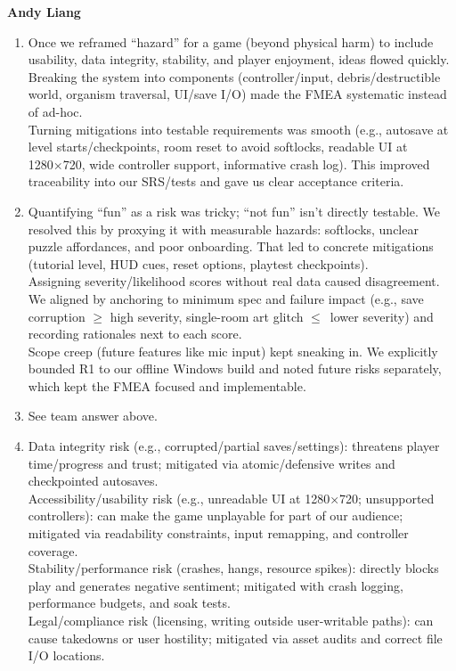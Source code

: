 \documentclass{article}
\begin{document}
\textbf{Andy Liang}
\begin{enumerate}
\item{Once we reframed “hazard” for a game (beyond physical harm) to include usability, data integrity, stability, and player enjoyment, ideas flowed quickly.\\

Breaking the system into components (controller/input, debris/destructible world, organism traversal, UI/save I/O) made the FMEA systematic instead of ad-hoc.\\

Turning mitigations into testable requirements was smooth (e.g., autosave at level starts/checkpoints, room reset to avoid softlocks, readable UI at 1280×720, wide controller support, informative crash log). This improved traceability into our SRS/tests and gave us clear acceptance criteria.}
\item{Quantifying “fun” as a risk was tricky; “not fun” isn’t directly testable. We resolved this by proxying it with measurable hazards: softlocks, unclear puzzle affordances, and poor onboarding. That led to concrete mitigations (tutorial level, HUD cues, reset options, playtest checkpoints).\\

Assigning severity/likelihood scores without real data caused disagreement. We aligned by anchoring to minimum spec and failure impact (e.g., save corruption $\geq$ high severity, single-room art glitch $\leq$\ lower severity) and recording rationales next to each score.\\

Scope creep (future features like mic input) kept sneaking in. We explicitly bounded R1 to our offline Windows build and noted future risks separately, which kept the FMEA focused and implementable.}
\item{See team answer above.}
\item{Data integrity risk (e.g., corrupted/partial saves/settings): threatens player time/progress and trust; mitigated via atomic/defensive writes and checkpointed autosaves.\\

Accessibility/usability risk (e.g., unreadable UI at 1280×720; unsupported controllers): can make the game unplayable for part of our audience; mitigated via readability constraints, input remapping, and controller coverage.\\

Stability/performance risk (crashes, hangs, resource spikes): directly blocks play and generates negative sentiment; mitigated with crash logging, performance budgets, and soak tests.\\

Legal/compliance risk (licensing, writing outside user-writable paths): can cause takedowns or user hostility; mitigated via asset audits and correct file I/O locations.}
\end{enumerate}
\end{document}
